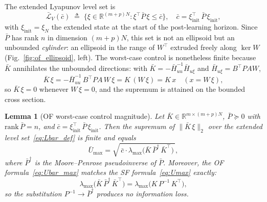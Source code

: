 \documentclass[final,5p,times,authoryear]{elsarticle}
\theoremstyle{plain}
\newtheorem{lemma}{Lemma}
\theoremstyle{definition}
\theoremstyle{remark}
\begin{document}
The extended Lyapunov level set is
\begin{equation}
\bar{\mathcal L}_V(\bar c)
   \;\triangleq\;
   \bigl\{\xi \in \mathbb{R}^{(m+p)N} :
          \xi^{\!\top}\!\bar P\,\xi \leq \bar c \bigr\},
\quad
\bar c = \xi_{\mathrm{init}}^{\!\top}\,\bar P\,\xi_{\mathrm{init}},
\label{eq:Lbar_def}
\end{equation}
with $\xi_{\mathrm{init}} = \xi_N$ the extended state at the start of
the post-learning horizon.  Since $\bar P$ has rank $n$ in dimension
$(m+p)N$, this set is not an ellipsoid but an unbounded
\emph{cylinder}: an ellipsoid in the range of $W^{\!\top}$ extruded
freely along $\ker W$ (Fig.~\ref{fig:of_ellipsoid}, left).  The
worst-case control is nonetheless finite because $\bar K$ annihilates
the unbounded directions: with $\bar K = -\bar H_{uu}^{-1}\bar H_{u\xi}$
and $\bar H_{u\xi} = B^{\!\top}\!PAW$,
\begin{equation}
\bar K\,\xi
   = -\bar H_{uu}^{-1}\,B^{\!\top}\!P A\,W\,\xi
   = K\,(W\,\xi) = K\,x
   \quad (x = W\,\xi),
\label{eq:Kbar_collapse}
\end{equation}
so $\bar K\,\xi = 0$ whenever $W\,\xi = 0$, and the supremum is attained
on the bounded cross section.

\begin{lemma}[OF worst-case control magnitude]\label{lemma:Ubar_max}
Let $\bar K \in \mathbb{R}^{m \times (m+p)N}$, $\bar P \succeq 0$ with
$\mathrm{rank}\,\bar P = n$, and
$\bar c = \xi_{\mathrm{init}}^{\!\top}\,\bar P\,\xi_{\mathrm{init}}$.
Then the supremum of $\|\bar K\,\xi\|_2$ over the extended level
set~\eqref{eq:Lbar_def} is finite and equals
\begin{equation}
\bar U_{\max}
   = \sqrt{\,\bar c\cdot
       \lambda_{\max}\!\bigl(\bar K\,\bar P^{\dagger}\,\bar K^{\!\top}\bigr)\,},
\label{eq:Ubar_max}
\end{equation}
where $\bar P^{\dagger}$ is the Moore--Penrose pseudoinverse of
$\bar P$.  Moreover, the OF formula~\eqref{eq:Ubar_max} matches the SF
formula~\eqref{eq:Umax} exactly:
\begin{equation}
\lambda_{\max}\!\bigl(\bar K\,\bar P^{\dagger}\,\bar K^{\!\top}\bigr)
   = \lambda_{\max}\!\bigl(K\,P^{-1}\,K^{\!\top}\bigr),
\label{eq:Ubar_match_sf}
\end{equation}
so the substitution $P^{-1} \to \bar P^{\dagger}$ produces no
information loss.
\end{lemma}
\end{document}
